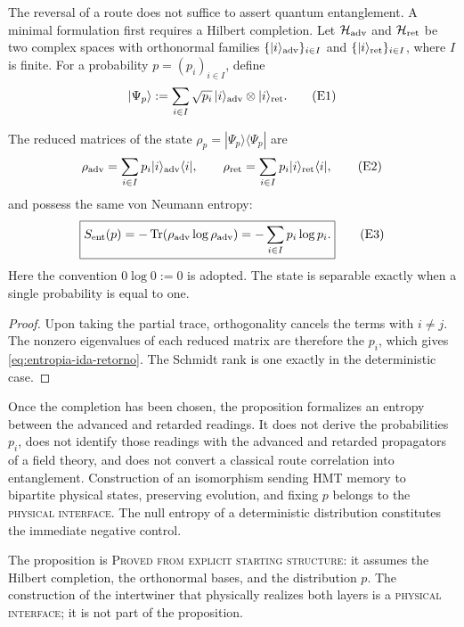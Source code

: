 The reversal of a route does not suffice to assert quantum entanglement. A
minimal formulation first requires a Hilbert completion. Let
\(\mathcal H_{\rm adv}\) and \(\mathcal H_{\rm ret}\) be two complex spaces
with orthonormal families
\(\{|i\rangle_{\rm adv}\}_{i\in I}\) and
\(\{|i\rangle_{\rm ret}\}_{i\in I}\), where \(I\) is finite. For a
probability \(p=(p_i)_{i\in I}\), define
\[
 |\Psi_p\rangle
 :=\sum_{i\in I}\sqrt{p_i}\,
 |i\rangle_{\rm adv}\otimes|i\rangle_{\rm ret}.
 \tag{E1}\label{eq:estado-entrelazado-ida-retorno}
\]

\begin{proposition}
\label{prop:entropia-entrelazamiento-ida-retorno}
The reduced matrices of the state
\(\rho_p=|\Psi_p\rangle\langle\Psi_p|\) are
\[
 \rho_{\rm adv}
 =\sum_{i\in I}p_i|i\rangle_{\rm adv}\langle i|,
 \qquad
 \rho_{\rm ret}
 =\sum_{i\in I}p_i|i\rangle_{\rm ret}\langle i|,
 \tag{E2}\label{eq:reducidas-ida-retorno}
\]
and possess the same von Neumann entropy:
\[
 \boxed{
 S_{\rm ent}(p)
 =-\operatorname{Tr}(\rho_{\rm adv}\log\rho_{\rm adv})
 =-\sum_{i\in I}p_i\log p_i.}
 \tag{E3}\label{eq:entropia-ida-retorno}
\]
Here the convention \(0\log0:=0\) is adopted. The state is separable
exactly when a single probability is equal to one.
\end{proposition}

\begin{proof}
Upon taking the partial trace, orthogonality cancels the terms with
\(i\ne j\). The nonzero eigenvalues of each reduced matrix are therefore
the \(p_i\), which gives \eqref{eq:entropia-ida-retorno}. The Schmidt
rank is one exactly in the deterministic case.
\end{proof}

Once the completion has been chosen, the proposition formalizes an entropy between
the advanced and retarded readings. It does not derive the probabilities \(p_i\), does not
identify those readings with the advanced and retarded propagators of a
field theory, and does not convert a classical route correlation into
entanglement. Construction of an isomorphism sending HMT memory
to bipartite physical states, preserving evolution, and fixing \(p\) belongs to
the \textsc{physical interface}. The null entropy of a deterministic
distribution constitutes the immediate negative control.

\begin{statusbox}
The proposition is
\textsc{Proved from explicit starting structure}: it assumes the
Hilbert completion, the orthonormal bases, and the distribution \(p\). The construction
of the intertwiner that physically realizes both layers is a
\textsc{physical interface}; it is not part of the proposition.
\end{statusbox}

